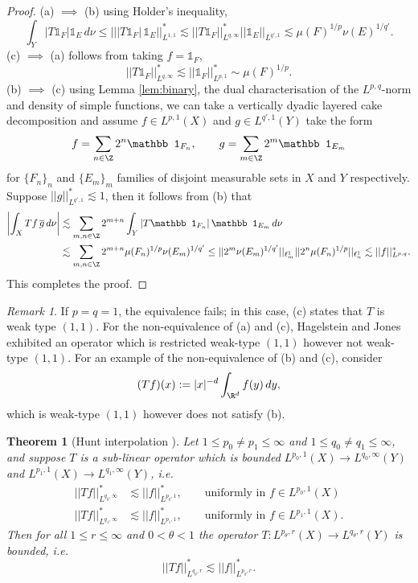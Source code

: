 \documentclass[reqno]{amsart}
\newtheorem{theorem}{Theorem}
\theoremstyle{definition}
\theoremstyle{remark}
\newtheorem*{remark}{Remark}
\begin{document}
\begin{proof}
	(a) $\implies$ (b) using Holder's inequality, 
		\[ \int_Y |T \mathbb 1_F | \mathbb 1_E \, d \nu \leq || |T\mathbb 1_F| \, \mathbb 1_E ||_{L^{1,1}}^* \lesssim || T\mathbb 1_F||_{L^{q, \infty}}^* || \mathbb 1_E||_{L^{q', 1}} \lesssim \mu(F)^{1/p} \nu(E)^{1/q'}. \]
	(c) $\implies$ (a) follows from taking $f = \mathbb 1_F$,
		\[ ||T \mathbb 1_F||_{L^{q, \infty}}^* \lesssim ||\mathbb 1_F||_{L^{p, 1}}^* \sim \mu(F)^{1/p}. \]
	(b) $\implies$ (c) using Lemma \ref{lem:binary}, the dual characterisation of the $L^{p, q}$-norm and density of simple functions, we can take a vertically dyadic layered cake decomposition and assume $f \in L^{p, 1} (X)$ and $g \in L^{q', 1} (Y)$ take the form
		\[ f = \sum_{n \in \Z} 2^n \mathbb 1_{F_n}, \qquad g = \sum_{m \in \Z} 2^m \mathbb 1_{E_m} \]
	for $\{F_n\}_n$ and $\{E_m\}_m$ families of disjoint measurable sets in $X$ and $Y$ respectively. Suppose $||g||_{L^{q', 1}}^* \lesssim 1$, then it follows from (b) that
		\begin{align*}
			\left| \int_X Tf \, \overline g \, d \nu \right|
				&\lesssim \sum_{m, n \in \Z} 2^{m + n} \int_Y |T\mathbb 1_{F_n} | \, \mathbb 1_{E_m} \, d\nu \\
				&\lesssim \sum_{m, n\in \Z} 2^{m + n} \mu(F_n)^{1/p} \nu(E_m)^{1/q'} \leq || 2^m \nu(E_m)^{1/q'} ||_{\ell^1_m} || 2^n \mu(F_n)^{1/p} ||_{\ell^1_n} \lesssim ||f||_{L^{p, q}}^*.
		\end{align*}
	This completes the proof. 
\end{proof}

\begin{remark}
	If $p = q = 1$, the equivalence fails; in this case, (c) states that $T$ is weak type $(1, 1)$. For the non-equivalence of (a) and (c), Hagelstein and Jones \cite{HagelJones} exhibited an operator which is restricted weak-type $(1, 1)$ however not weak-type $(1, 1)$. For an example of the non-equivalence of (b) and (c), consider
		\[ (Tf) (x) := |x|^{-d}\int_{\R^d} f(y) \, dy, \]
	which is weak-type $(1, 1)$ however does not satisfy (b).
\end{remark}


\begin{theorem}[Hunt interpolation \cite{Hunt}]
	Let $1 \leq p_0 \neq p_1 \leq \infty$ and $1 \leq q_0 \neq q_1 \leq \infty$, and suppose $T$ is a sub-linear operator which is bounded $L^{p_0, 1} (X) \to L^{q_0, \infty} (Y)$ and $L^{p_1, 1} (X) \to L^{q_1, \infty} (Y)$, i.e.
		\begin{align*}
			||Tf||_{L^{q_0, \infty}}^* 
				&\lesssim ||f||_{L^{p_0, 1}}^*, \qquad  \text{uniformly in $f \in L^{p_0, 1} (X)$}\\
			||Tf||_{L^{q_1, \infty}}^* 
				&\lesssim ||f||_{L^{p_1, 1}}^*, \qquad  \text{uniformly in $f \in L^{p_1, 1} (X)$.}	
		\end{align*}
	Then for all $1 \leq r \leq \infty$ and $0 < \theta < 1$ the operator $T: L^{p_\theta, r} (X) \to L^{q_\theta, r} (Y)$ is bounded, i.e.
		\[ ||Tf||_{L^{q_\theta, r}}^* \lesssim ||f||_{L^{p_\theta, r}}^*. \]	
\end{theorem}
\end{document}
